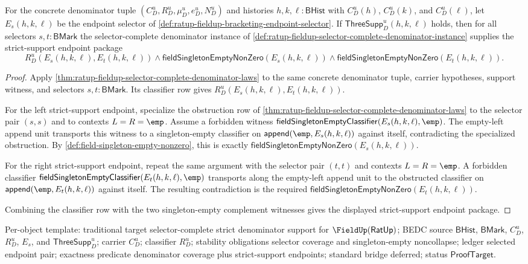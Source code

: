 \begin{theorem}
\label{thm:ratup-fieldup-selector-complete-denominator-strict-support-package}
For the concrete denominator tuple $(C_D^u,R_D^u,\mu_D^u,e_D^u,N_D^u)$ and
histories $h,k,\ell:\mathsf{BHist}$ with $C_D^u(h)$, $C_D^u(k)$, and
$C_D^u(\ell)$, let $E_s(h,k,\ell)$ be the endpoint selector of
\autoref{def:ratup-fieldup-bracketing-endpoint-selector}. If
$\mathsf{ThreeSupp}_D^u(h,k,\ell)$ holds, then for all selectors
$s,t:\mathsf{BMark}$ the selector-complete denominator instance of
\autoref{def:ratup-fieldup-selector-complete-denominator-instance} supplies
the strict-support endpoint package
$$
R_D^u(E_s(h,k,\ell),E_t(h,k,\ell))
\land
\mathsf{fieldSingletonEmptyNonZero}(E_s(h,k,\ell))
\land
\mathsf{fieldSingletonEmptyNonZero}(E_t(h,k,\ell)).
$$
\end{theorem}
\begin{proof}
Apply
\autoref{thm:ratup-fieldup-selector-complete-denominator-laws} to the
same concrete denominator tuple, carrier hypotheses, support witness, and
selectors $s,t:\mathsf{BMark}$. Its classifier row gives
$R_D^u(E_s(h,k,\ell),E_t(h,k,\ell))$.

For the left strict-support endpoint, specialize the obstruction row of
\autoref{thm:ratup-fieldup-selector-complete-denominator-laws}
to the selector pair $(s,s)$ and to contexts $L=R=\emp$. Assume a forbidden witness
$\mathsf{fieldSingletonEmptyClassifier}(E_s(h,k,\ell),\emp)$. The empty-left
append unit transports this witness to a singleton-empty classifier on
$\mathsf{append}(\emp,E_s(h,k,\ell))$ against itself, contradicting the
specialized obstruction. By
\autoref{def:field-singleton-empty-nonzero}, this is exactly
$\mathsf{fieldSingletonEmptyNonZero}(E_s(h,k,\ell))$.

For the right strict-support endpoint, repeat the same argument with the
selector pair $(t,t)$ and contexts $L=R=\emp$. A forbidden classifier
$\mathsf{fieldSingletonEmptyClassifier}(E_t(h,k,\ell),\emp)$ transports along
the empty-left append unit to the obstructed classifier on
$\mathsf{append}(\emp,E_t(h,k,\ell))$ against itself. The resulting
contradiction is the required
$\mathsf{fieldSingletonEmptyNonZero}(E_t(h,k,\ell))$.

Combining the classifier row with the two singleton-empty complement witnesses
gives the displayed strict-support endpoint package.
\end{proof}

Per-object template: traditional target selector-complete strict denominator
support for $\FieldUp(\mathsf{RatUp})$; BEDC source $\mathsf{BHist}$,
$\mathsf{BMark}$, $C_D^u$, $R_D^u$, $E_s$, and
$\mathsf{ThreeSupp}_D^u$; carrier $C_D^u$; classifier $R_D^u$; stability
obligations selector coverage and singleton-empty noncollapse; ledger selected
endpoint pair; exactness predicate denominator coverage plus strict-support
endpoints; standard bridge deferred; status $\mathsf{ProofTarget}$.

